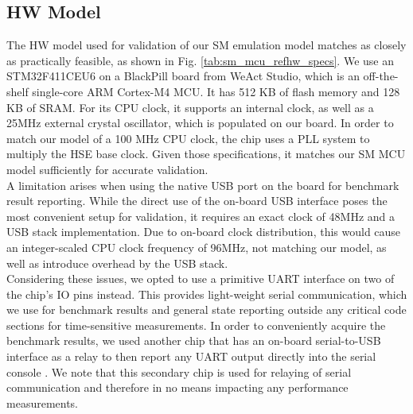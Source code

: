 \documentclass[english]{tudscrartcl}
\begin{document}
		\subsection{HW Model}
			\label{sec:sysmodel_hwmodel}
			The \ac{HW} model used for validation of our \ac{SM} emulation model matches as closely as practically feasible, as shown in Fig. \ref{tab:sm_mcu_refhw_specs}.
			We use an STM32F411CEU6 on a BlackPill board from WeAct Studio, which is an off-the-shelf single-core ARM Cortex-M4 MCU.
			It has 512 KB of flash memory and 128 KB of SRAM.
			For its \ac{CPU} clock, it supports an internal clock, as well as a 25MHz external crystal oscillator, which is populated on our board.
			In order to match our model of a 100 MHz \ac{CPU} clock, the chip uses a \ac{PLL} system to multiply the \ac{HSE} base clock.
			Given those specifications, it matches our \ac{SM} \ac{MCU} model sufficiently for accurate validation. 
			\\
			A limitation arises when using the native USB port on the board for benchmark result reporting.
			While the direct use of the on-board USB interface poses the most convenient setup for validation, it requires an exact clock of 48MHz and a USB stack implementation.
			Due to on-board clock distribution, this would cause an integer-scaled \ac{CPU} clock frequency of 96MHz, not matching our model, as well as introduce overhead by the USB stack.
			\\
			Considering these issues, we opted to use a primitive \ac{UART} interface on two of the chip's IO pins instead.
			This provides light-weight serial communication, which we use for benchmark results and general state reporting outside any critical code sections for time-sensitive measurements.
			In order to conveniently acquire the benchmark results, we used another chip that has an on-board serial-to-USB interface as a relay to then report any \ac{UART} output directly into the serial console \cite{ACAE-REPO}.
			We note that this secondary chip is used for relaying of serial communication and therefore in no means impacting any performance measurements.
\end{document}
